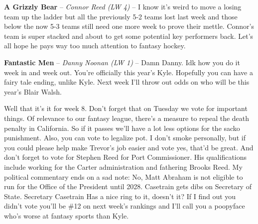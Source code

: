 \documentclass[11pt,letterpaper]{article}
\begin{document}
\begin{etaremune}
\item \textbf{A Grizzly Bear} -- \textit{Connor Reed (LW 4)} -- I know it's weird to move a losing team up the ladder but all the previously 5-2 teams lost last week and those below the now 5-3 teams still need one more week to prove their mettle. Connor's team is super stacked and about to get some potential key performers back. Let's all hope he pays way too much attention to fantasy hockey.
\item \textbf{Fantastic Men} -- \textit{Danny Noonan (LW 1)} -- Damn Danny. Idk how you do it week in and week out. You're officially this year's Kyle. Hopefully you can have a fairy tale ending, unlike Kyle. Next week I'll throw out odds on who will be this year's Blair Walsh. 
\end{etaremune}
Well that it's it for week 8. Don't forget that on Tuesday we vote for important things. Of relevance to our fantasy league, there's a measure to repeal the death penalty in California. So if it passes we'll have a lot less options for the sacko punishment. Also, you can vote to legalize pot. I don't smoke personally, but if you could please help make Trevor's job easier and vote yes, that'd be great. And don't forget to vote for Stephen Reed for Port Commissioner. His qualifications include working for the Carter administration and fathering Brooks Reed. My political commentary ends on a sad note: No, Matt Abraham is not eligible to run for the Office of the President until 2028. Casetrain gets dibs on Secretary of State. Secretary Casetrain Has a nice ring to it, doesn't it? If I find out you didn't vote you'll be \#12 on next week's rankings and I'll call you a poopyface who's worse at fantasy sports than Kyle.
\end{document}
